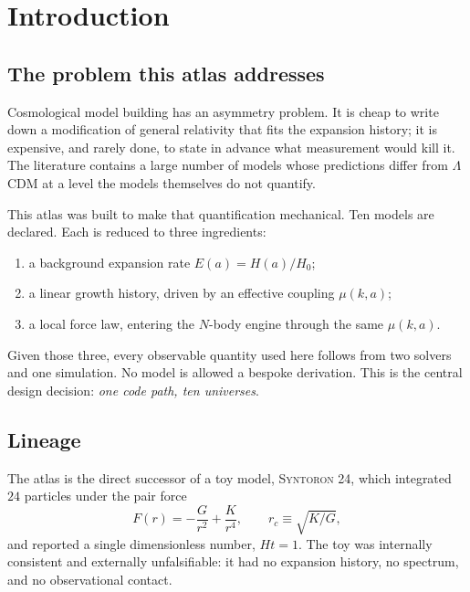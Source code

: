 \documentclass[11pt,a4paper]{article}
\theoremstyle{definition}
\newcommand{\muc}{\mu(k,a)}
\begin{document}
{\setlength{\parskip}{0.05em}\footnotesize
\tableofcontents}
\newpage

\section{Introduction}
\label{sec:intro}

\subsection{The problem this atlas addresses}

Cosmological model building has an asymmetry problem. It is cheap to write
down a modification of general relativity that fits the expansion history;
it is expensive, and rarely done, to state in advance what measurement would
kill it. The literature contains a large number of models whose predictions
differ from $\Lambda$CDM at a level the models themselves do not quantify.

This atlas was built to make that quantification mechanical. Ten models are
declared. Each is reduced to three ingredients:

\begin{enumerate}[label=(\roman*)]
\item a background expansion rate $E(a) = H(a)/H_0$;
\item a linear growth history, driven by an effective coupling $\muc$;
\item a local force law, entering the $N$-body engine through the same
      $\muc$.
\end{enumerate}

Given those three, every observable quantity used here follows from two
solvers and one simulation. No model is allowed a bespoke derivation. This
is the central design decision: \emph{one code path, ten universes}.

\subsection{Lineage}

The atlas is the direct successor of a toy model, \textsc{Syntoron 24}, which
integrated $24$ particles under the pair force
\begin{equation}
F(r) = -\frac{G}{r^2} + \frac{K}{r^4},
\qquad r_c \equiv \sqrt{K/G},
\label{eq:force}
\end{equation}
and reported a single dimensionless number, $H t = 1$. The toy was internally
consistent and externally unfalsifiable: it had no expansion history, no
spectrum, and no observational contact.
\end{document}
